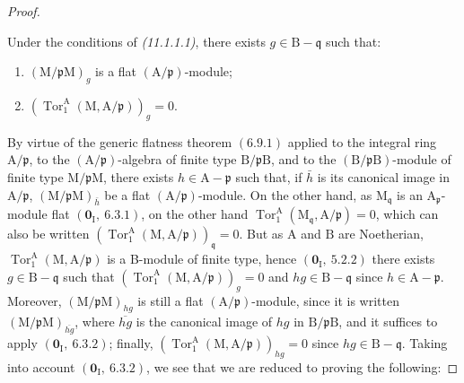 \begin{proof}
\begin{lemma}[11.1.1.2]
\label{IV.11.1.1.2}
Under the conditions of \emph{(11.1.1.1)}, there exists $g\in\mathrm{B}-\mathfrak{q}$ such that:
\begin{enumerate}[label=\emph{\roman*)}]
  \item $(\mathrm{M}/\mathfrak{p}\mathrm{M})_g$ is a flat $(\mathrm{A}/\mathfrak{p})$-module;
  \item $(\operatorname{Tor}_1^\mathrm{A}(\mathrm{M},\mathrm{A}/\mathfrak{p}))_g=0$.
\end{enumerate}
\end{lemma}


By virtue of the generic flatness theorem $(6.9.1)$ applied to the integral ring $\mathrm{A}/\mathfrak{p}$, to the $(\mathrm{A}/\mathfrak{p})$-algebra of finite type $\mathrm{B}/\mathfrak{p}\mathrm{B}$, and to the $(\mathrm{B}/\mathfrak{p}\mathrm{B})$-module of finite type $\mathrm{M}/\mathfrak{p}\mathrm{M}$, there exists $h\in\mathrm{A}-\mathfrak{p}$ such that, if $\bar{h}$ is its canonical image in $\mathrm{A}/\mathfrak{p}$, $(\mathrm{M}/\mathfrak{p}\mathrm{M})_{\bar{h}}$ be a flat $(\mathrm{A}/\mathfrak{p})$-module.
On the other hand, as $\mathrm{M}_\mathfrak{q}$ is an $\mathrm{A}_\mathfrak{p}$-module flat $(\mathbf{0}_\mathrm{I},~6.3.1)$, on the other hand $\operatorname{Tor}_1^\mathrm{A}(\mathrm{M}_\mathfrak{q},\mathrm{A}/\mathfrak{p})=0$, which can also be written $(\operatorname{Tor}_1^\mathrm{A}(\mathrm{M},\mathrm{A}/\mathfrak{p}))_\mathfrak{q}=0$. But as $\mathrm{A}$ and $\mathrm{B}$ are Noetherian, $\operatorname{Tor}_1^\mathrm{A}(\mathrm{M},\mathrm{A}/\mathfrak{p})$ is a B-module of finite type, hence $(\mathbf{0}_\mathrm{I},~5.2.2)$ there exists $g\in\mathrm{B}-\mathfrak{q}$ such that $(\operatorname{Tor}_1^\mathrm{A}(\mathrm{M},\mathrm{A}/\mathfrak{p}))_g=0$ and $hg\in\mathrm{B}-\mathfrak{q}$ since $h\in\mathrm{A}-\mathfrak{p}$. Moreover, $(\mathrm{M}/\mathfrak{p}\mathrm{M})_{hg}$ is still a flat $(\mathrm{A}/\mathfrak{p})$-module, since it is written $(\mathrm{M}/\mathfrak{p}\mathrm{M})_{\overline{hg}}$, where $\overline{hg}$ is the canonical image of $hg$ in $\mathrm{B}/\mathfrak{p}\mathrm{B}$, and it suffices to apply $(\mathbf{0}_\mathrm{I},~6.3.2)$; finally, $(\operatorname{Tor}_1^\mathrm{A}(\mathrm{M},\mathrm{A}/\mathfrak{p}))_{hg}=0$ since $hg\in\mathrm{B}-\mathfrak{q}$. Taking into account $(\mathbf{0}_\mathrm{I},~6.3.2)$, we see that we are reduced to proving the following:
\end{proof}

